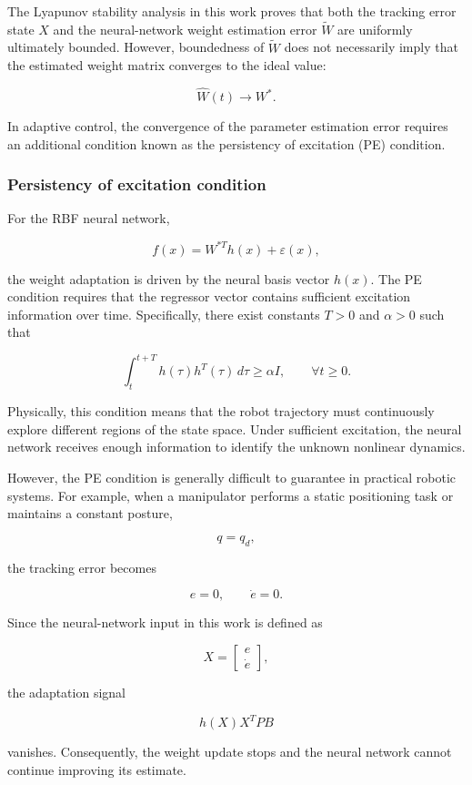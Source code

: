 The Lyapunov stability analysis in this work proves that both the tracking error state $X$ and the neural-network weight estimation error $\tilde W$ are uniformly ultimately bounded. However, boundedness of $\tilde W$ does not necessarily imply that the estimated weight matrix converges to the ideal value:

\[
\hat W(t)\rightarrow W^{*}.
\]

In adaptive control, the convergence of the parameter estimation error requires an additional condition known as the persistency of excitation (PE) condition.


\subsubsection{Persistency of excitation condition}

For the RBF neural network,

\[
f(x)=W^{*T}h(x)+\varepsilon(x),
\]

the weight adaptation is driven by the neural basis vector $h(x)$. The PE condition requires that the regressor vector contains sufficient excitation information over time. Specifically, there exist constants $T>0$ and $\alpha>0$ such that

\[
\int_t^{t+T}
h(\tau)h^T(\tau)
\,d\tau
\geq
\alpha I,
\qquad
\forall t\geq0 .
\]

Physically, this condition means that the robot trajectory must continuously explore different regions of the state space. Under sufficient excitation, the neural network receives enough information to identify the unknown nonlinear dynamics.


However, the PE condition is generally difficult to guarantee in practical robotic systems. For example, when a manipulator performs a static positioning task or maintains a constant posture,

\[
q=q_d,
\]

the tracking error becomes

\[
e=0,\qquad \dot e=0.
\]

Since the neural-network input in this work is defined as

\[
X=
\begin{bmatrix}
	e\\
	\dot e
\end{bmatrix},
\]

the adaptation signal

\[
h(X)X^TPB
\]

vanishes. Consequently, the weight update stops and the neural network cannot continue improving its estimate.


